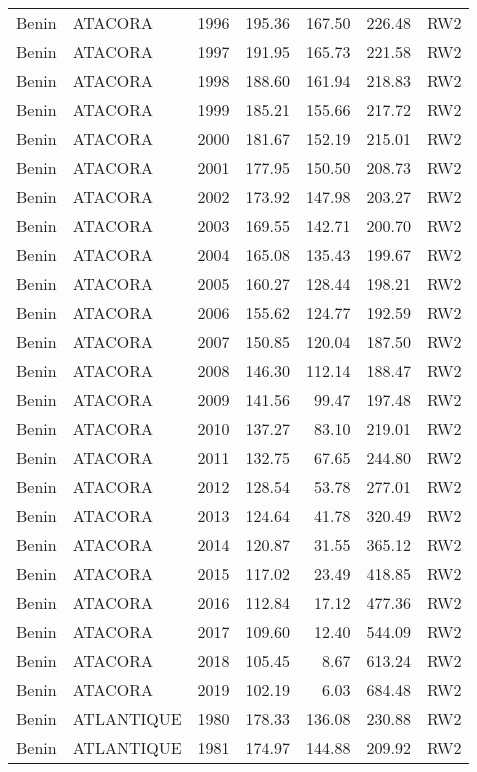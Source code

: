 \begin{longtable}{lllrrrl}
  Benin & ATACORA & 1996 & 195.36 & 167.50 & 226.48 & RW2 \\ 
  Benin & ATACORA & 1997 & 191.95 & 165.73 & 221.58 & RW2 \\ 
  Benin & ATACORA & 1998 & 188.60 & 161.94 & 218.83 & RW2 \\ 
  Benin & ATACORA & 1999 & 185.21 & 155.66 & 217.72 & RW2 \\ 
  Benin & ATACORA & 2000 & 181.67 & 152.19 & 215.01 & RW2 \\ 
  Benin & ATACORA & 2001 & 177.95 & 150.50 & 208.73 & RW2 \\ 
  Benin & ATACORA & 2002 & 173.92 & 147.98 & 203.27 & RW2 \\ 
  Benin & ATACORA & 2003 & 169.55 & 142.71 & 200.70 & RW2 \\ 
  Benin & ATACORA & 2004 & 165.08 & 135.43 & 199.67 & RW2 \\ 
  Benin & ATACORA & 2005 & 160.27 & 128.44 & 198.21 & RW2 \\ 
  Benin & ATACORA & 2006 & 155.62 & 124.77 & 192.59 & RW2 \\ 
  Benin & ATACORA & 2007 & 150.85 & 120.04 & 187.50 & RW2 \\ 
  Benin & ATACORA & 2008 & 146.30 & 112.14 & 188.47 & RW2 \\ 
  Benin & ATACORA & 2009 & 141.56 & 99.47 & 197.48 & RW2 \\ 
  Benin & ATACORA & 2010 & 137.27 & 83.10 & 219.01 & RW2 \\ 
  Benin & ATACORA & 2011 & 132.75 & 67.65 & 244.80 & RW2 \\ 
  Benin & ATACORA & 2012 & 128.54 & 53.78 & 277.01 & RW2 \\ 
  Benin & ATACORA & 2013 & 124.64 & 41.78 & 320.49 & RW2 \\ 
  Benin & ATACORA & 2014 & 120.87 & 31.55 & 365.12 & RW2 \\ 
  Benin & ATACORA & 2015 & 117.02 & 23.49 & 418.85 & RW2 \\ 
  Benin & ATACORA & 2016 & 112.84 & 17.12 & 477.36 & RW2 \\ 
  Benin & ATACORA & 2017 & 109.60 & 12.40 & 544.09 & RW2 \\ 
  Benin & ATACORA & 2018 & 105.45 & 8.67 & 613.24 & RW2 \\ 
  Benin & ATACORA & 2019 & 102.19 & 6.03 & 684.48 & RW2 \\ 
  Benin & ATLANTIQUE & 1980 & 178.33 & 136.08 & 230.88 & RW2 \\ 
  Benin & ATLANTIQUE & 1981 & 174.97 & 144.88 & 209.92 & RW2 \\ 

\end{longtable}
